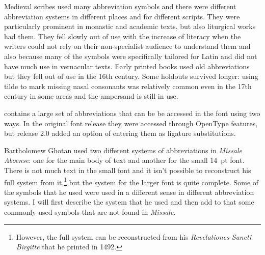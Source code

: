 \documentclass[a4paper, 12pt]{article}
\begin{document}
Medieval scribes used many abbreviation symbols and there were
different abbreviation systems in different places and for different
scripts. They were particularly prominent in monastic and academic
texts, but also liturgical works had them. They fell slowly out of use
with the increase of literacy when the writers could not rely on their
non-specialist audience to understand them and also because many of
the symbols were specifically tailored for Latin and did not have much
use in vernacular texts. Early printed books used old abbreviations
but they fell out of use in the 16th century. Some holdouts survived
longer: using tilde to mark missing nasal consonants was relatively
common even in the 17th century in some areas and the ampersand is
still in use.

\Missaali{} contains a large set of abbreviations that can be be
accessed in the font using two ways. In the original font release they
were accessed through OpenType features, but release 2.0 added an
option of entering them as ligature substitutions.

Bartholomew Ghotan used two different systems of abbreviations in
\emph{Mis\-sale Aboense}: one for the main body of text and another
for the small 14~pt font. There is not much text in the small font and
it isn't possible to reconstruct his full system from
it,\footnote{However, the full system can be reconstructed from his
  \emph{Revelationes Sancti Birgitte} that he printed in 1492.} but
the system for the larger font is quite complete. Some of the symbols
that he used were used in a different sense in different abbreviation
systems. I will first describe the system that he used and then add to
that some commonly-used symbols that are not found in \emph{Missale}.
\end{document}
